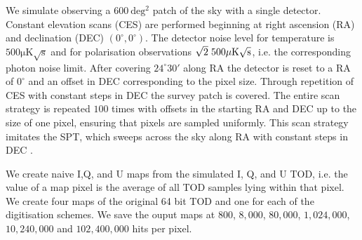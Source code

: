 \documentclass[apj]{emulateapj}
\begin{document}

We simulate observing a $600 \> \mathrm{ deg^2}$ patch of the sky with a single detector. Constant elevation scans (CES) are performed beginning at right ascension (RA) and declination (DEC) $(0^\circ, 0^\circ)$. The detector noise level for temperature is $500 \mathrm{\mu K \sqrt{s}}$ and for polarisation observations $\sqrt{2} \hspace{0.7ex} 500 \mathrm{\mu K \sqrt{s}}$, i.e. the corresponding photon noise limit. After covering $24^\circ30'$ along RA the detector is reset to a RA of $0^\circ$ and an offset in DEC corresponding to the pixel size. Through repetition of CES with constant steps in DEC the survey patch is covered. The entire scan strategy is repeated $100$ times with offsets in the starting RA and DEC up to the size of one pixel, ensuring that pixels are sampled uniformly. This scan strategy imitates the SPT, which sweeps across the sky along RA with constant steps in DEC \citep{schaffer2011}.

We create naive I,Q, and U maps from the simulated I, Q, and U TOD, i.e. the value of a map pixel is the average of all TOD samples lying within that pixel. We create four maps of the original 64 bit TOD and one for each of the digitisation schemes. We save the ouput maps at $800$, $8,000$, $80,000$, $1,024,000$, $10,240,000$ and $102,400,000$ hits per pixel.


\end{document}
